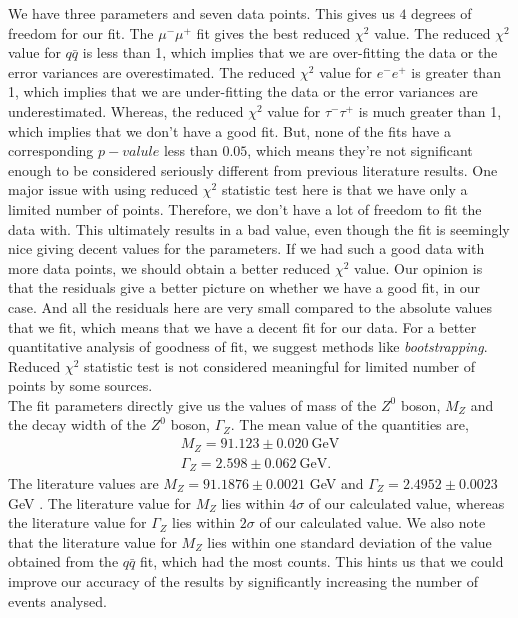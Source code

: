 We have three parameters and seven data points. This gives us $4$ degrees of freedom for our fit. The $\mu^-\mu^+$ fit gives the best reduced $\chi^2$ value. The reduced $\chi^2$ value for $q\bar{q}$ is less than 1, which implies that we are over-fitting the data or the error variances are overestimated. The reduced $\chi^2$ value for $e^-e^+$ is greater than 1, which implies that we are under-fitting the data or the error variances are underestimated. Whereas, the reduced $\chi^2$ value for $\tau^-\tau^+$ is much greater than 1, which implies that we don't have a good fit\cite{bevington}. But, none of the fits have a corresponding $p-valule$ less than $0.05$, which means they're not significant enough to be considered seriously different from previous literature results\cite{pvalue}. One major issue with using reduced $\chi^2$ statistic test here is that we have only a limited number of points. Therefore, we don't have a lot of freedom to fit the data with. This ultimately results in a bad value, even though the fit is seemingly nice giving decent values for the parameters. If we had such a good data with more data points, we should obtain a better reduced $\chi^2$ value. Our opinion is that the residuals give a better picture on whether we have a good fit, in our case. And all the residuals here are very small compared to the absolute values that we fit, which means that we have a decent fit for our data. For a better quantitative analysis of goodness of fit, we suggest methods like \textit{bootstrapping}. Reduced $\chi^2$ statistic test is not considered meaningful for limited number of points by some sources\cite{andrae}.\\
The fit parameters directly give us the values of mass of the $Z^0$ boson, $M_Z$ and the decay width of the $Z^0$ boson, $\Gamma_Z$. The mean value of the quantities are,
\begin{equation}
\begin{split}
    M_Z = 91.123 \pm 0.020 ~ \text{GeV}\\
    \Gamma_Z = 2.598 \pm 0.062 ~ \text{GeV}.
\end{split}
\end{equation}
The literature values are $M_Z = 91.1876 \pm 0.0021$ GeV and $\Gamma_Z = 2.4952 \pm 0.0023$ GeV \cite{pdg2}. The literature value for $M_Z$ lies within $4\sigma$ of our calculated value, whereas the literature value for $\Gamma_Z$ lies within $2\sigma$ of our calculated value. We also note that the literature value for $M_Z$ lies within one standard deviation of the value obtained from the $q\bar{q}$ fit, which had the most counts. This hints us that we could improve our accuracy of the results by significantly increasing the number of events analysed.


